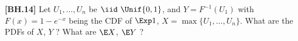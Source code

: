 \begin{exercise}
	\textbf{[BH.14]}  Let $U_1, \ldots, U_n$ be $\iid \ \Unif{0,1}$, and $Y=F^{-1}(U_1)$ with $F(x)=1-e^{-x}$ being the CDF of $\Exp 1$, $X=\max\{U_1, \ldots, U_n\}$. What are the PDFs of $X$, $Y$ ? What are $\E X$, $\E Y$ ?
\end{exercise}
